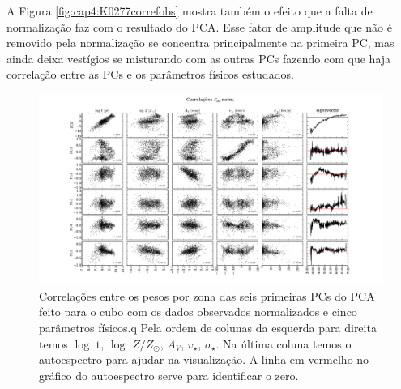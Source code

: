 A Figura \ref{fig:cap4:K0277correfobs} mostra também o efeito que a falta de normalização faz com o resultado do PCA.
Esse fator de amplitude que não é removido pela normalização se concentra principalmente na primeira PC, mas ainda
deixa vestígios se misturando com as outras PCs fazendo com que haja correlação entre as PCs e os parâmetros físicos
estudados.

\begin{figure}
    \includegraphics[width=1.4\textwidth, angle=-90]{figuras/K0277-correl-f_obs_norm-PCvsPhys.pdf}
	\caption[Correlações PCs vs. par\^ametros f\'isicos - $F_{obs}$ norm.]
    {Correlações entre os pesos por zona das seis primeiras PCs do PCA feito para o cubo com os dados observados
    normalizados e cinco parâmetros físicos.q Pela ordem de colunas da esquerda para direita temos $\log$ t, $\log$ $Z /
    Z_{\odot}$, $A_V$, $v_{\star}$, $\sigma_{\star}$. Na última coluna temos o autoespectro para ajudar na visualização.
    A linha em vermelho no gráfico do autoespectro serve para identificar o zero.}
    \label{fig:cap4:K0277correfobsnorm}
\end{figure}

